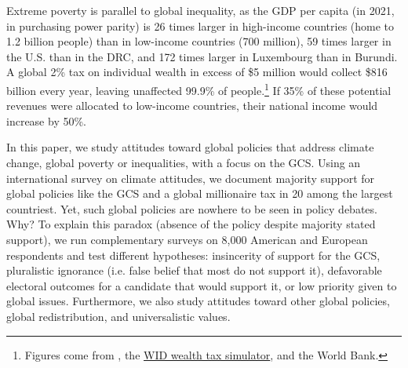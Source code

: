Extreme poverty is parallel to global inequality, as the GDP per capita (in 2021, in purchasing power parity) is 26 times larger in high-income countries (home to 1.2 billion people) than in low-income countries (700 million), 59 times larger in the U.S. than in the DRC, and 172 times larger in Luxembourg than in Burundi. A global 2\% tax on individual wealth in excess of \$5 million would collect \$816 billion every year, leaving unaffected 99.9\% of people.\footnote{Figures come from \citet{chancel_world_2022}, the \href{https://wid.world/world-wealth-tax-simulator/}{WID wealth tax simulator}, and the World Bank.} If 35\% of these potential revenues were allocated to low-income countries, their national income would increase by 50\%. %


In this paper, we study attitudes toward global policies that address climate change, global poverty or inequalities, with a focus on the GCS. Using an international survey on climate attitudes, we document majority support for global policies like the GCS and a global millionaire tax in 20 among the largest countriest. Yet, such global policies are nowhere to be seen in policy debates. Why? To explain this paradox (absence of the policy despite majority stated support), we run complementary surveys on 8,000 American and European respondents and test different hypotheses: insincerity of support for the GCS, pluralistic ignorance (i.e. false belief that most do not support it), defavorable electoral outcomes for a candidate that would support it, or low priority given to global issues. Furthermore, we also study attitudes toward other global policies, global redistribution, and universalistic values.

